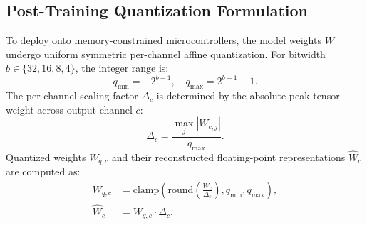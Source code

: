 \documentclass[10pt,twocolumn,letterpaper]{article}
\begin{document}
\subsection{Post-Training Quantization Formulation}

To deploy onto memory-constrained microcontrollers, the model weights $W$ undergo uniform symmetric per-channel affine quantization. For bitwidth $b \in \{32, 16, 8, 4\}$, the integer range is:
\begin{equation}
    q_{\min} = -2^{b-1}, \quad q_{\max} = 2^{b-1} - 1.
\end{equation}
The per-channel scaling factor $\Delta_c$ is determined by the absolute peak tensor weight across output channel $c$:
\begin{equation}
    \Delta_c = \frac{\max_j |W_{c,j}|}{q_{\max}}.
\end{equation}
Quantized weights $W_{q,c}$ and their reconstructed floating-point representations $\hat{W}_c$ are computed as:
\begin{align}
    W_{q,c} &= \text{clamp}\left(\text{round}\left(\frac{W_c}{\Delta_c}\right), q_{\min}, q_{\max}\right), \\
    \hat{W}_c &= W_{q,c} \cdot \Delta_c.
\end{align}
\end{document}

